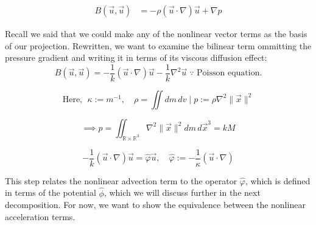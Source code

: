\documentclass[12pt]{article}
\begin{document}
\begin{align*}
B(\vec{u}, \vec{u}) &= -\rho (\vec{u} \cdot \nabla) \vec{u} + \nabla p
\end{align*}

Recall we said that we could make any of the nonlinear vector terms as the basis of our projection. Rewritten, we want to examine the bilinear term ommitting the pressure gradient and writing it in terms of its viscous diffusion effect:
\[
B(\vec{u}, \vec{u}) = -\frac{1}{k} (\vec{u} \cdot \nabla) \vec{u} - \frac{1}{k} \nabla^2 \vec{u} \; \because \text{ Poisson equation.}
\]

\[
    \text{Here, }\;\kappa := m^{-1}, \quad \rho = \iint dm \, dv \;|\; p := \rho \nabla^{2} \|\vec x\|^{2}
\]

\[
\implies p = \iint_{\mathbb{R} \times \mathbb{R}^{3}} \nabla^{2} \|\vec x\|^{2} dm \, d \vec x^{3} = kM
\]

\[
- \frac{1}{k} (\vec{u} \cdot \nabla) \vec{u} = \hat{\varphi} \vec{u}, \quad \hat{\varphi} := - \frac{1}{\kappa} (\vec u \cdot \nabla)
\]

This step relates the nonlinear advection term to the operator \(\hat{\varphi}\), which is defined in terms of the potential \(\hat{\phi}\), which we will discuss further in the next decomposition. For now, we want to show the equivalence between the nonlinear acceleration terms.







\end{document}
